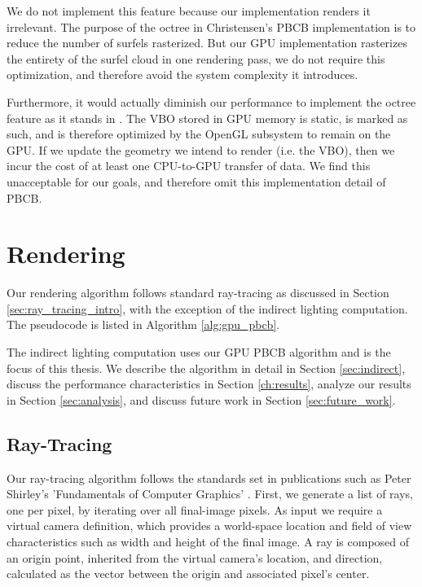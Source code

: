 We do not implement this feature because our implementation renders it irrelevant. The purpose of the octree in Christensen's PBCB implementation \cite{bib:christensen2008} is to reduce the number of surfels rasterized. But our GPU implementation rasterizes the entirety of the surfel cloud in one rendering pass, we do not require this optimization, and therefore avoid the system complexity it introduces.

Furthermore, it would actually diminish our performance to implement the octree feature as it stands in \cite{bib:christensen2008}. The VBO stored in GPU memory is static, is marked as such, and is therefore optimized by the OpenGL subsystem to remain on the GPU. If we update the geometry we intend to render (i.e. the VBO), then we incur the cost of at least one CPU-to-GPU transfer of data. We find this unacceptable for our goals, and therefore omit this implementation detail of PBCB.

\section{Rendering}
\label{sec:rendering}
Our rendering algorithm follows standard ray-tracing as discussed in Section \ref{sec:ray_tracing_intro}, with the exception of the indirect lighting computation. The pseudocode is listed in Algorithm \ref{alg:gpu_pbcb}.

The indirect lighting computation uses our GPU PBCB algorithm and is the focus of this thesis. We describe the algorithm in detail in Section \ref{sec:indirect}, discuss the performance characteristics in Section \ref{ch:results}, analyze our results in Section \ref{sec:analysis}, and discuss future work in Section \ref{sec:future_work}.

\subsection{Ray-Tracing}
\label{sec:rendering_ray_tracing}
Our ray-tracing algorithm follows the standards set in publications such as Peter Shirley's 'Fundamentals of Computer Graphics' \cite{bib:shirley_fundamentals}. First, we generate a list of rays, one per pixel, by iterating over all final-image pixels. As input we require a virtual camera definition, which provides a world-space location and field of view characteristics such as width and height of the final image. A ray is composed of an origin point, inherited from the virtual camera's location, and direction, calculated as the vector between the origin and associated pixel's center.

